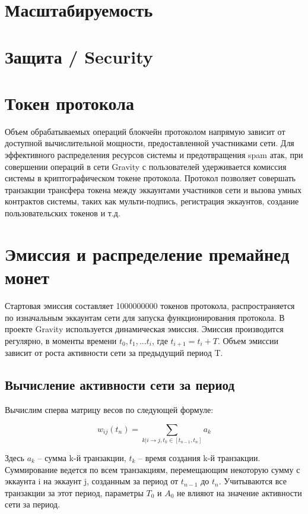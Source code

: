 \documentclass[a4paper,12pt]{article}
\begin{document}
\section{Масштабируемость}

\section{Защита / Security}

\section{Токен протокола}
Объем обрабатываемых операций блокчейн протоколом напрямую зависит от доступной вычислительной мощности, предоставленной участниками сети. Для эффективного распределения ресурсов системы и предотвращения spam атак, при совершении операций в сети Gravity с пользователей удерживается комиссия системы в криптографическом токене протокола.
Протокол позволяет совершать транзакции трансфера токена между эккаунтами участников сети и вызова умных контрактов системы, таких как мульти-подпись, регистрация эккаунтов, создание пользовательских токенов и т.д. 

\section{Эмиссия и распределение премайнед монет}

Стартовая эмиссия составляет 1000000000 токенов протокола, распространяется по изначальным эккаунтам сети для запуска функционирования протокола.   
В проекте Gravity используется динамическая эмиссия. Эмиссия производится регулярно, в моменты времени $t_0, t_1, ... t_i$, где $t_{i+1} = t_i + T$. Объем эмиссии зависит от роста активности сети за предыдущий период T.

\subsection{Вычисление активности сети за период}

Вычислим сперва матрицу весов по следующей формуле:

$$
w_{ij}(t_n)=\sum_{k|i \to j, t_k \in [t_{n-1}, t_n]}a_k
$$

Здесь $a_k$ – сумма k-й транзакции, $t_k$ – время создания k-й транзакции. Суммирование ведется по всем транзакциям, перемещающим некоторую сумму с эккаунта i на эккаунт j, созданным за период от $t_{n-1}$ до $t_n$. Учитываются все транзакции за этот период, параметры $T_0$ и $A_0$ не влияют на значение активности сети за период.
\end{document}

